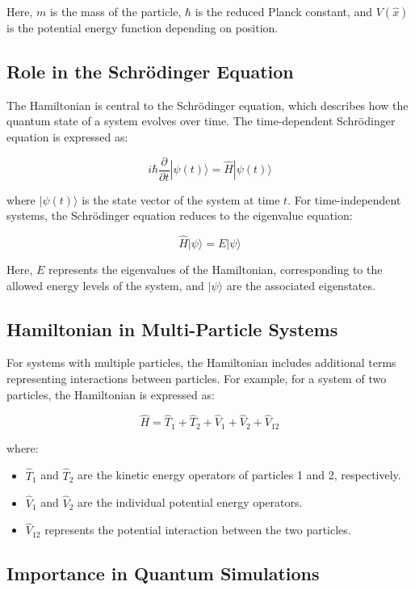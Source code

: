 Here, \( m \) is the mass of the particle, \( \hbar \) is the reduced Planck constant, and \( V(\hat{x}) \) is the potential energy function depending on position.

\subsection{Role in the Schrödinger Equation}

The Hamiltonian is central to the Schrödinger equation, which describes how the quantum state of a system evolves over time. The time-dependent Schrödinger equation is expressed as:

\[
i\hbar \frac{\partial}{\partial t} |\psi(t)\rangle = \hat{H} |\psi(t)\rangle
\]

where \( |\psi(t)\rangle \) is the state vector of the system at time \( t \). For time-independent systems, the Schrödinger equation reduces to the eigenvalue equation:

\[
\hat{H} |\psi\rangle = E |\psi\rangle
\]

Here, \( E \) represents the eigenvalues of the Hamiltonian, corresponding to the allowed energy levels of the system, and \( |\psi\rangle \) are the associated eigenstates.

\subsection{Hamiltonian in Multi-Particle Systems}

For systems with multiple particles, the Hamiltonian includes additional terms representing interactions between particles. For example, for a system of two particles, the Hamiltonian is expressed as:

\[
\hat{H} = \hat{T}_1 + \hat{T}_2 + \hat{V}_1 + \hat{V}_2 + \hat{V}_{12}
\]

where:

\begin{itemize}
    \item \( \hat{T}_1 \) and \( \hat{T}_2 \) are the kinetic energy operators of particles 1 and 2, respectively.
    \item \( \hat{V}_1 \) and \( \hat{V}_2 \) are the individual potential energy operators.
    \item \( \hat{V}_{12} \) represents the potential interaction between the two particles.
\end{itemize}

\subsection{Importance in Quantum Simulations}

